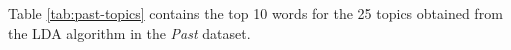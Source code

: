 %		
%		
%		

Table \ref{tab:past-topics} contains the top 10 words for the 25 topics obtained from the LDA algorithm in the \textit{Past} dataset.



